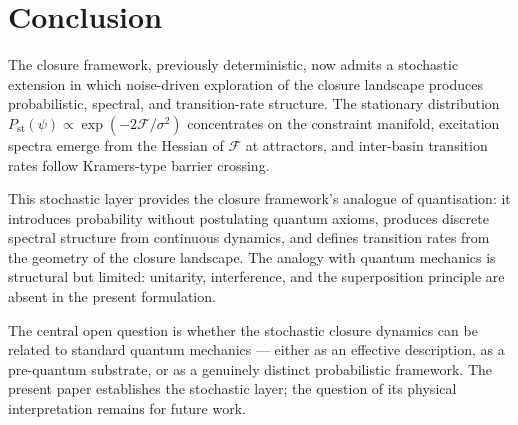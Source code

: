\documentclass[12pt]{article}
\newcommand{\Fcal}{\mathcal{F}}
\begin{document}
\section{Conclusion}\label{sec:conclusion}

The closure framework, previously deterministic, now admits a stochastic extension in which noise-driven exploration of the closure landscape produces probabilistic, spectral, and transition-rate structure. The stationary distribution $P_{\mathrm{st}}(\psi) \propto \exp(-2\Fcal/\sigma^2)$ concentrates on the constraint manifold, excitation spectra emerge from the Hessian of $\Fcal$ at attractors, and inter-basin transition rates follow Kramers-type barrier crossing.

This stochastic layer provides the closure framework's analogue of quantisation: it introduces probability without postulating quantum axioms, produces discrete spectral structure from continuous dynamics, and defines transition rates from the geometry of the closure landscape. The analogy with quantum mechanics is structural but limited: unitarity, interference, and the superposition principle are absent in the present formulation.

The central open question is whether the stochastic closure dynamics can be related to standard quantum mechanics --- either as an effective description, as a pre-quantum substrate, or as a genuinely distinct probabilistic framework. The present paper establishes the stochastic layer; the question of its physical interpretation remains for future work.



\end{document}
